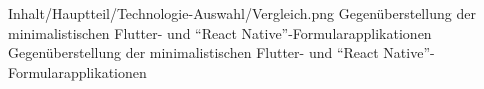 \begin{alexfigure}{Inhalt/Hauptteil/Technologie-Auswahl/Vergleich.png}
   {Gegenüberstellung der minimalistischen {Flutter}- und \enquote{React Native}-Formular\-ap\-pli\-ka\-ti\-on\-en}
   {Gegenüberstellung der minimalistischen {Flutter}- und \enquote{React Native}-Formular\-ap\-pli\-ka\-ti\-on\-en}
 
   \label{fig:Vergleich}
 
 \end{alexfigure}